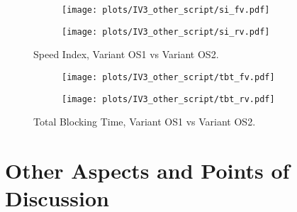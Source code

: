 \clearpage

\begin{figure}
	\centering
	\begin{subfigure}{.5\textwidth}
		\centering
		\texttt{[image: plots/IV3\_other\_script/si\_fv.pdf]}
		\label{fig:sub1}
	\end{subfigure}%
	\begin{subfigure}{.5\textwidth}
		\centering
		\texttt{[image: plots/IV3\_other\_script/si\_rv.pdf]}
		\label{fig:sub2}
	\end{subfigure}
	\caption{Speed Index, Variant OS1 vs Variant OS2.}
	\label{figure:plt_original_test}
\end{figure}


\begin{figure}
	\centering
	\begin{subfigure}{.5\textwidth}
		\centering
		\texttt{[image: plots/IV3\_other\_script/tbt\_fv.pdf]}
		\label{fig:sub1}
	\end{subfigure}%
	\begin{subfigure}{.5\textwidth}
		\centering
		\texttt{[image: plots/IV3\_other\_script/tbt\_rv.pdf]}
		\label{fig:sub2}
	\end{subfigure}
	\caption{Total Blocking Time, Variant OS1 vs Variant OS2.}
	\label{figure:plt_original_test}
\end{figure}

















\section{Other Aspects and Points of Discussion}



